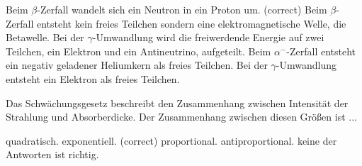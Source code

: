 \documentclass[11pt]{exam}
\begin{document}
\begin{questions}
\begin{choices}
	\choice Beim \( \beta \)-Zerfall wandelt sich ein Neutron in ein Proton um. (correct)
	\choice Beim \( \beta \)-Zerfall entsteht kein freies Teilchen sondern eine elektromagnetische Welle, die Betawelle.
	\choice Bei der \( \gamma \)-Umwandlung wird die freiwerdende Energie auf zwei Teilchen, ein Elektron und ein Antineutrino, aufgeteilt.
	\choice Beim \( \alpha^- \)-Zerfall entsteht ein negativ geladener Heliumkern als freies Teilchen.
	\choice Bei der \( \gamma \)-Umwandlung entsteht ein Elektron als freies Teilchen.
\end{choices}

\vspace{3mm}\question Das Schwächungsgesetz beschreibt den Zusammenhang zwischen Intensität der Strahlung und Absorberdicke. Der Zusammenhang zwischen diesen Größen ist ...

\begin{choices}
	\choice quadratisch.
	\choice exponentiell. (correct)
	\choice proportional.
	\choice antiproportional.
	\choice keine der Antworten ist richtig.
\end{choices}

\vspace{3mm}\end{questions}
\end{document}
